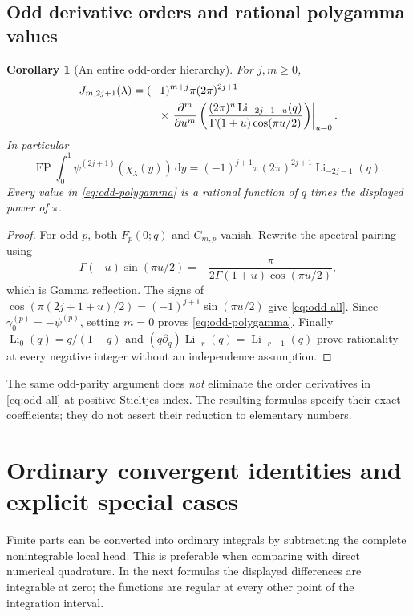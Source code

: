 \documentclass[11pt]{article}
\newtheorem{corollary}[theorem]{Corollary}
\theoremstyle{definition}\newtheorem{definition}[theorem]{Definition}
\theoremstyle{remark}\newtheorem{remark}[theorem]{Remark}
\DeclareMathOperator{\Li}{Li}
\DeclareMathOperator{\FP}{FP}
\newcommand{\dd}{\,\mathrm d}
\begin{document}
\subsection{Odd derivative orders and rational polygamma values}
\begin{corollary}[An entire odd-order hierarchy]\label{cor:odd}
For $j,m\ge0$,
\begin{align}\label{eq:odd-all}
J_{m,2j+1}(\lambda)
={}&(-1)^{m+j}\pi(2\pi)^{2j+1}\\
&\quad\times\left.\frac{\partial^m}{\partial u^m}
\left(\frac{(2\pi)^u\Li_{-2j-1-u}(q)}{\Gamma(1+u)\cos(\pi u/2)}\right)\right|_{u=0}.\notag
\end{align}
In particular
\begin{equation}\label{eq:odd-polygamma}
\boxed{\displaystyle
\FP\int_0^1\psi^{(2j+1)}(\chi_\lambda(y))\dd y
=(-1)^{j+1}\pi(2\pi)^{2j+1}\Li_{-2j-1}(q).}
\end{equation}
Every value in \eqref{eq:odd-polygamma} is a rational function of $q$ times the displayed power of $\pi$.
\end{corollary}
\begin{proof}
For odd $p$, both $F_p(0;q)$ and $C_{m,p}$ vanish. Rewrite the spectral pairing using
\[
\Gamma(-u)\sin(\pi u/2)
=-\frac{\pi}{2\Gamma(1+u)\cos(\pi u/2)},
\]
which is Gamma reflection. The signs of
$\cos(\pi(2j+1+u)/2)=(-1)^{j+1}\sin(\pi u/2)$
give \eqref{eq:odd-all}. Since $\gamma_0^{(p)}=-\psi^{(p)}$, setting $m=0$ proves \eqref{eq:odd-polygamma}. Finally
$\Li_0(q)=q/(1-q)$ and $(q\partial_q)\Li_{-r}(q)=\Li_{-r-1}(q)$ prove rationality at every negative integer without an independence assumption.
\end{proof}
The same odd-parity argument does \emph{not} eliminate the order derivatives in \eqref{eq:odd-all} at positive Stieltjes index. The resulting formulas specify their exact coefficients; they do not assert their reduction to elementary numbers.

\section{Ordinary convergent identities and explicit special cases}
\label{sec:ordinary}
Finite parts can be converted into ordinary integrals by subtracting the complete nonintegrable local head. This is preferable when comparing with direct numerical quadrature. In the next formulas the displayed differences are integrable at zero; the functions are regular at every other point of the integration interval.
\end{document}
